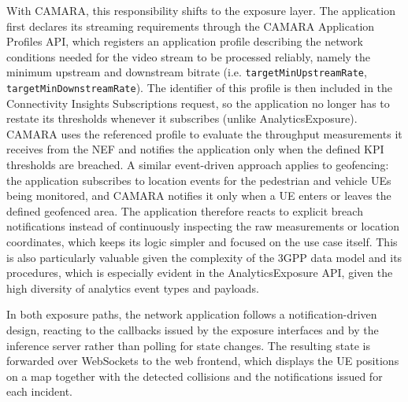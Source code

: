 With CAMARA, this responsibility shifts to the exposure layer. The application first declares its streaming requirements through the CAMARA Application Profiles \acs{API}, which registers an application profile describing the network conditions needed for the video stream to be processed reliably, namely the minimum upstream and downstream bitrate (i.e. \texttt{targetMinUpstreamRate}, \texttt{targetMinDownstreamRate}). The identifier of this profile is then included in the Connectivity Insights Subscriptions request, so the application no longer has to restate its thresholds whenever it subscribes (unlike AnalyticsExposure). CAMARA uses the referenced profile to evaluate the throughput measurements it receives from the \acs{NEF} and notifies the application only when the defined \acs{KPI} thresholds are breached. A similar event-driven approach applies to geofencing: the application subscribes to location events for the pedestrian and vehicle \acsp{UE} being monitored, and CAMARA notifies it only when a \acs{UE} enters or leaves the defined geofenced area. The application therefore reacts to explicit breach notifications instead of continuously inspecting the raw measurements or location coordinates, which keeps its logic simpler and focused on the use case itself. This is also particularly valuable given the complexity of the \acs{3GPP} data model and its procedures, which is especially evident in the AnalyticsExposure \acs{API}, given the high diversity of analytics event types and payloads.

In both exposure paths, the network application follows a notification-driven design, reacting to the callbacks issued by the exposure interfaces and by the inference server rather than polling for state changes. The resulting state is forwarded over WebSockets to the web frontend, which displays the \acs{UE} positions on a map together with the detected collisions and the notifications issued for each incident.
